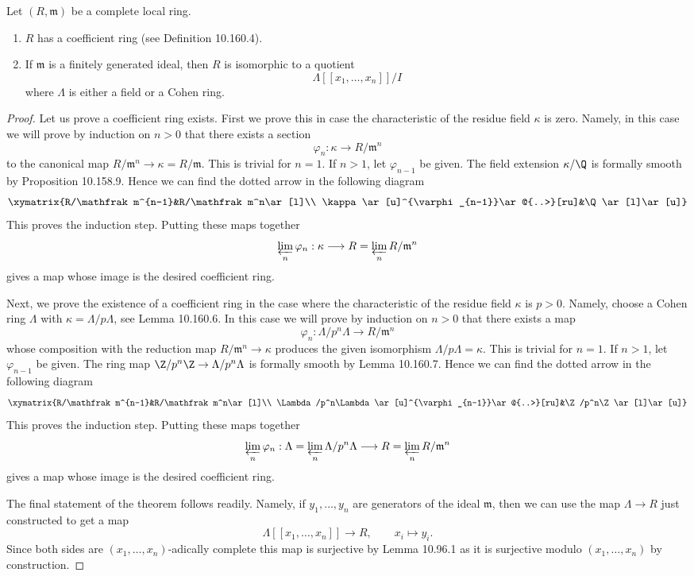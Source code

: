 \begin{theorem}
Let $(R,\mathfrak m)$ be a complete local ring.
\begin{enumerate}
\item $R$ has a coefficient ring (see Definition 10.160.4).
\item If $\mathfrak m$ is a finitely generated ideal, then $R$ is isomorphic to a quotient
\[
\Lambda[[x_1,\ldots,x_n]]/I
\]
where $\Lambda$ is either a field or a Cohen ring.
\end{enumerate}
\end{theorem}
\begin{proof}
Let us prove a coefficient ring exists. First we prove this in case the characteristic of the residue field $\kappa$ is zero. Namely, in this case we will prove by induction on $n>0$ that there exists a section
\[
\varphi_n:\kappa\longrightarrow R/\mathfrak m^n
\]
to the canonical map $R/\mathfrak m^n\to\kappa=R/\mathfrak m$. This is trivial for $n=1$. If $n>1$, let $\varphi_{n-1}$ be given. The field extension $\kappa/\Q$ is formally smooth by Proposition 10.158.9. Hence we can find the dotted arrow in the following diagram
\[
\xymatrix{R/\mathfrak m^{n-1}&R/\mathfrak m^n\ar[l]\\
\kappa\ar[u]^{\varphi_{n-1}}\ar@{..>}[ru]&\Q\ar[l]\ar[u]}
\]
This proves the induction step. Putting these maps together
\[
\varprojlim_n\varphi_n:\kappa\longrightarrow R=\varprojlim_nR/\mathfrak m^n
\]
gives a map whose image is the desired coefficient ring.

Next, we prove the existence of a coefficient ring in the case where the characteristic of the residue field $\kappa$ is $p>0$. Namely, choose a Cohen ring $\Lambda$ with $\kappa=\Lambda/p\Lambda$, see Lemma 10.160.6. In this case we will prove by induction on $n>0$ that there exists a map
\[
\varphi_n:\Lambda/p^n\Lambda\longrightarrow R/\mathfrak m^n
\]
whose composition with the reduction map $R/\mathfrak m^n\to\kappa$ produces the given isomorphism $\Lambda/p\Lambda=\kappa$. This is trivial for $n=1$. If $n>1$, let $\varphi_{n-1}$ be given. The ring map $\Z/p^n\Z\to\Lambda/p^n\Lambda$ is formally smooth by Lemma 10.160.7. Hence we can find the dotted arrow in the following diagram
\[
\xymatrix{R/\mathfrak m^{n-1}&R/\mathfrak m^n\ar[l]\\
\Lambda/p^n\Lambda\ar[u]^{\varphi_{n-1}}\ar@{..>}[ru]&\Z/p^n\Z\ar[l]\ar[u]}
\]
This proves the induction step. Putting these maps together
\[
\varprojlim_n\varphi_n:\Lambda=\varprojlim_n\Lambda/p^n\Lambda\longrightarrow R=\varprojlim_nR/\mathfrak m^n
\]
gives a map whose image is the desired coefficient ring.

The final statement of the theorem follows readily. Namely, if $y_1,\ldots,y_n$ are generators of the ideal $\mathfrak m$, then we can use the map $\Lambda\to R$ just constructed to get a map
\[
\Lambda[[x_1,\ldots,x_n]]\longrightarrow R,\qquad x_i\longmapsto y_i.
\]
Since both sides are $(x_1,\ldots,x_n)$-adically complete this map is surjective by Lemma 10.96.1 as it is surjective modulo $(x_1,\ldots,x_n)$ by construction.
\end{proof}

